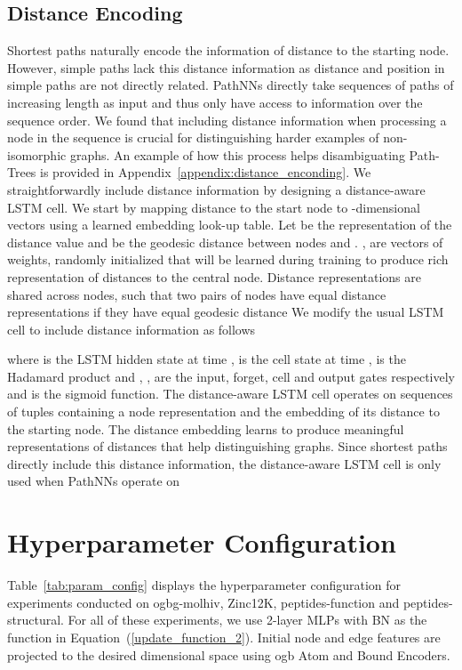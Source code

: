 \documentclass{article}
\theoremstyle{plain}
\theoremstyle{definition}
\theoremstyle{remark}
\begin{document}
\subsection{Distance Encoding}
\label{appendix:distance_encoding}
Shortest paths naturally encode the information of distance to the starting node.
However, simple paths lack this distance information as distance and position in simple paths are not directly related.
PathNNs directly take sequences of paths of increasing length as input and thus only have access to information over the sequence order. We found that including distance information when processing a node in the sequence is crucial for distinguishing harder examples of non-isomorphic graphs.
An example of how this process helps disambiguating Path-Trees is provided in Appendix~\ref{appendix:distance_enconding}.
We straightforwardly include distance information by designing a distance-aware LSTM cell.
We start by mapping distance to the start node to -dimensional vectors using a learned embedding look-up table.
Let  be the representation of the distance value  and  be the geodesic distance between nodes  and . ,  are vectors of weights, randomly initialized that will be learned during training to produce rich representation of distances to the central node.
Distance representations are shared across nodes, such that two pairs of nodes have equal distance representations if they have equal geodesic distance 
We modify the usual LSTM cell to include distance information as follows

where  is the LSTM hidden state at time ,  is the cell state at time ,  is the Hadamard product and , ,   are the input, forget, cell and output gates respectively and  is the sigmoid function.
The distance-aware LSTM cell operates on sequences of tuples containing a node representation and the embedding of its distance to the starting node.
The distance embedding learns to produce meaningful representations of distances that help distinguishing graphs.
Since shortest paths directly include this distance information, the distance-aware LSTM cell is only used when PathNNs operate on 

\section{Hyperparameter Configuration}
\label{appendix:hyperparameters}
Table~\ref{tab:param_config} displays the hyperparameter configuration for experiments conducted on ogbg-molhiv, Zinc12K, peptides-function and peptides-structural. For all of these experiments, we use 2-layer MLPs  with BN as the  function in Equation~(\ref{update_function_2}). Initial node and edge features are projected to the desired dimensional space using ogb Atom and Bound Encoders. 
\end{document}
